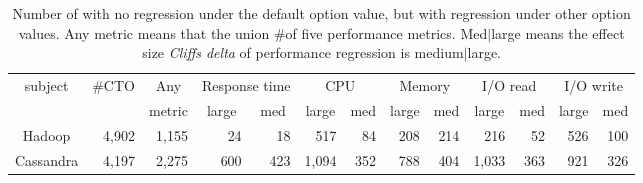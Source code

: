 \begin{table}[t]
\centering
\caption{Number of \instance with no regression under the default option value, but with regression under other option values. Any metric means that the union \#\instance of five performance metrics.
Med$|$large means the effect size \emph{Cliff\textquotesingle s delta} of performance regression is medium$|$large.} %
    \begin{tabular}{|c|c|c|c|r|c|r|c|r|c|r|c|r|}
\hline
\multirow{2}{*}{subject} & \multirow{2}{*}{\#CTO}     & Any                        & \multicolumn{2}{c|}{Response time}                  & \multicolumn{2}{c|}{CPU}                              & \multicolumn{2}{c|}{Memory}                         & \multicolumn{2}{c|}{I/O read}                         & \multicolumn{2}{c|}{I/O write}                      \\ \cline{4-13} 
                         &                            & metric                     & large                    & \multicolumn{1}{c|}{med} & large                      & \multicolumn{1}{c|}{med} & large                    & \multicolumn{1}{c|}{med} & large                      & \multicolumn{1}{c|}{med} & large                    & \multicolumn{1}{c|}{med} \\ \hline
Hadoop                   & \multicolumn{1}{r|}{4,902} & \multicolumn{1}{r|}{1,155} & \multicolumn{1}{r|}{24}  & 18                       & \multicolumn{1}{r|}{517}   & 84                       & \multicolumn{1}{r|}{208} & 214                      & \multicolumn{1}{r|}{216}   & 52                       & \multicolumn{1}{r|}{526} & 100                      \\ \hline
Cassandra                & \multicolumn{1}{r|}{4,197} & \multicolumn{1}{r|}{2,275} & \multicolumn{1}{r|}{600} & 423                      & \multicolumn{1}{r|}{1,094} & 352                      & \multicolumn{1}{r|}{788} & 404                      & \multicolumn{1}{r|}{1,033} & 363                      & \multicolumn{1}{r|}{921} & 326                      \\ \hline
\end{tabular}
\label{tab:option_regression}
\end{table}

